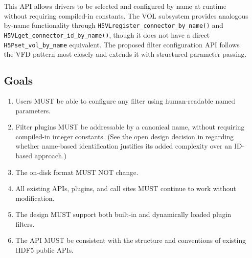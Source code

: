 \documentclass[../HDF5_RFC.tex]{subfiles}
\begin{document}
This API allows drivers to be selected and configured by name at runtime
without requiring compiled-in constants. The VOL subsystem provides analogous
by-name functionality through \texttt{H5VLregister\_connector\_by\_name()} and
\texttt{H5VLget\_connector\_id\_by\_name()}, though it does not have a direct
\texttt{H5Pset\_vol\_by\_name} equivalent. The proposed filter configuration API follows
the VFD pattern most closely and extends it with structured parameter passing.

\subsection{Goals}

\begin{enumerate}
\item Users MUST be able to configure any filter using human-readable named
   parameters.
\item Filter plugins MUST be addressable by a canonical name, without requiring
   compiled-in integer constants. (See the open design decision in
    regarding whether name-based
   identification justifies its added complexity over an ID-based approach.)
\item The on-disk format MUST NOT change.
\item All existing APIs, plugins, and call sites MUST continue to work without
   modification.
\item The design MUST support both built-in and dynamically loaded plugin
   filters.
\item The API MUST be consistent with the structure and conventions of existing
   HDF5 public APIs.
\end{enumerate}
\end{document}
